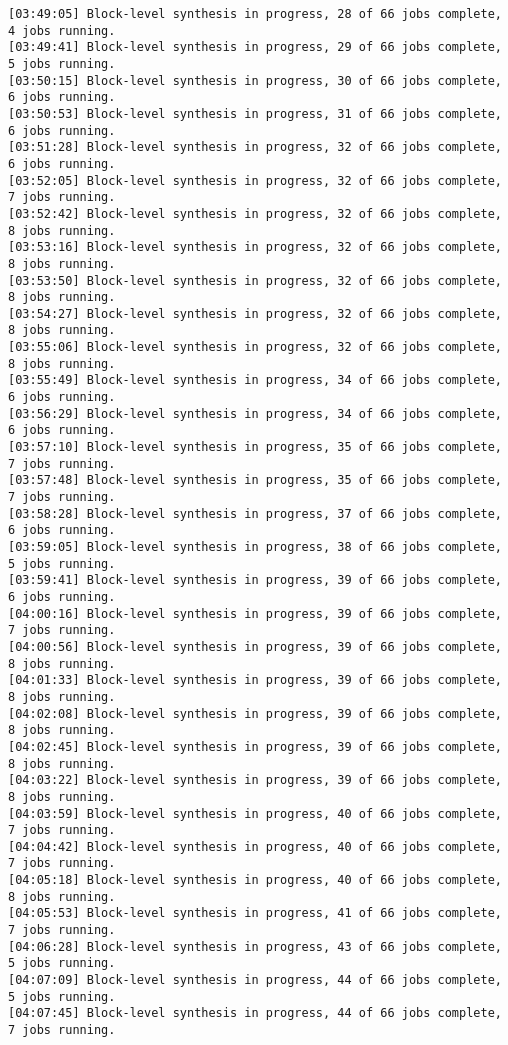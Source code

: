 \begin{center}
\begin{lstlisting}[label=lst:vlog,caption=Файл v++\_vinc.log]
[03:49:05] Block-level synthesis in progress, 28 of 66 jobs complete, 4 jobs running.
[03:49:41] Block-level synthesis in progress, 29 of 66 jobs complete, 5 jobs running.
[03:50:15] Block-level synthesis in progress, 30 of 66 jobs complete, 6 jobs running.
[03:50:53] Block-level synthesis in progress, 31 of 66 jobs complete, 6 jobs running.
[03:51:28] Block-level synthesis in progress, 32 of 66 jobs complete, 6 jobs running.
[03:52:05] Block-level synthesis in progress, 32 of 66 jobs complete, 7 jobs running.
[03:52:42] Block-level synthesis in progress, 32 of 66 jobs complete, 8 jobs running.
[03:53:16] Block-level synthesis in progress, 32 of 66 jobs complete, 8 jobs running.
[03:53:50] Block-level synthesis in progress, 32 of 66 jobs complete, 8 jobs running.
[03:54:27] Block-level synthesis in progress, 32 of 66 jobs complete, 8 jobs running.
[03:55:06] Block-level synthesis in progress, 32 of 66 jobs complete, 8 jobs running.
[03:55:49] Block-level synthesis in progress, 34 of 66 jobs complete, 6 jobs running.
[03:56:29] Block-level synthesis in progress, 34 of 66 jobs complete, 6 jobs running.
[03:57:10] Block-level synthesis in progress, 35 of 66 jobs complete, 7 jobs running.
[03:57:48] Block-level synthesis in progress, 35 of 66 jobs complete, 7 jobs running.
[03:58:28] Block-level synthesis in progress, 37 of 66 jobs complete, 6 jobs running.
[03:59:05] Block-level synthesis in progress, 38 of 66 jobs complete, 5 jobs running.
[03:59:41] Block-level synthesis in progress, 39 of 66 jobs complete, 6 jobs running.
[04:00:16] Block-level synthesis in progress, 39 of 66 jobs complete, 7 jobs running.
[04:00:56] Block-level synthesis in progress, 39 of 66 jobs complete, 8 jobs running.
[04:01:33] Block-level synthesis in progress, 39 of 66 jobs complete, 8 jobs running.
[04:02:08] Block-level synthesis in progress, 39 of 66 jobs complete, 8 jobs running.
[04:02:45] Block-level synthesis in progress, 39 of 66 jobs complete, 8 jobs running.
[04:03:22] Block-level synthesis in progress, 39 of 66 jobs complete, 8 jobs running.
[04:03:59] Block-level synthesis in progress, 40 of 66 jobs complete, 7 jobs running.
[04:04:42] Block-level synthesis in progress, 40 of 66 jobs complete, 7 jobs running.
[04:05:18] Block-level synthesis in progress, 40 of 66 jobs complete, 8 jobs running.
[04:05:53] Block-level synthesis in progress, 41 of 66 jobs complete, 7 jobs running.
[04:06:28] Block-level synthesis in progress, 43 of 66 jobs complete, 5 jobs running.
[04:07:09] Block-level synthesis in progress, 44 of 66 jobs complete, 5 jobs running.
[04:07:45] Block-level synthesis in progress, 44 of 66 jobs complete, 7 jobs running.

\end{lstlisting}
\end{center}
